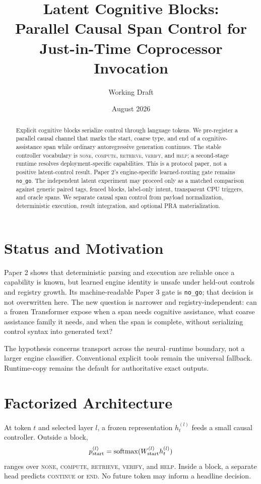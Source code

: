 \documentclass[10pt]{article}
\title{Latent Cognitive Blocks:\\Parallel Causal Span Control for Just-in-Time Coprocessor Invocation}
\author{Working Draft}\date{August 2026}
\begin{document}
\maketitle

\begin{abstract}
Explicit cognitive blocks serialize control through language tokens. We
pre-register a parallel causal channel that marks the start, coarse type, and
end of a cognitive-assistance span while ordinary autoregressive generation
continues. The stable controller vocabulary is \textsc{none}, \textsc{compute},
\textsc{retrieve}, \textsc{verify}, and \textsc{help}; a second-stage runtime
resolves deployment-specific capabilities. This is a protocol paper, not a
positive latent-control result. Paper 2's engine-specific learned-routing gate
remains \texttt{no\_go}. The independent latent experiment may proceed only as
a matched comparison against generic paired tags, fenced blocks, label-only
intent, transparent CPU triggers, and oracle spans. We separate causal span
control from payload normalization, deterministic execution, result
integration, and optional PRA materialization.
\end{abstract}

\section{Status and Motivation}
Paper 2 shows that deterministic parsing and execution are reliable once a
capability is known, but learned engine identity is unsafe under held-out
controls and registry growth. Its machine-readable Paper 3 gate is
\texttt{no\_go}; that decision is not overwritten here. The new question is
narrower and registry-independent: can a frozen Transformer expose when a span
needs cognitive assistance, what coarse assistance family it needs, and when
the span is complete, without serializing control syntax into generated text?

The hypothesis concerns transport across the neural--runtime boundary, not a
larger engine classifier. Conventional explicit tools remain the universal
fallback. Runtime-copy remains the default for authoritative exact outputs.

\section{Factorized Architecture}
At token $t$ and selected layer $l$, a frozen representation $h_t^{(l)}$ feeds a
small causal controller. Outside a block,
\[
p_{\rm start}^{(l)}=\operatorname{softmax}(W_{\rm start}^{(l)}h_t^{(l)})
\]
ranges over \textsc{none}, \textsc{compute}, \textsc{retrieve},
\textsc{verify}, and \textsc{help}. Inside a block, a separate head predicts
\textsc{continue} or \textsc{end}. No future token may inform a headline
decision.
\end{document}
